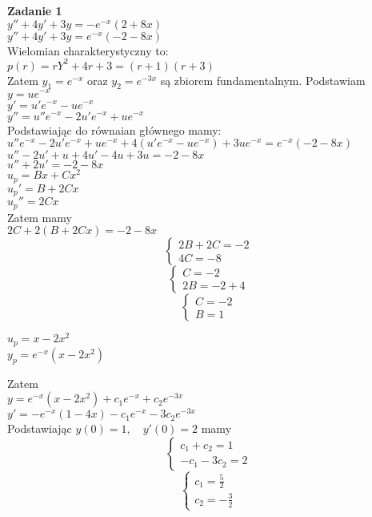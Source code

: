 \documentclass[10pt,a4paper]{article}
\author{ola}
\begin{document}
	\textbf{Zadanie 1} \\
	$y'' + 4y' +3y = -e^{-x}(2+8x) $ \\
	$y'' + 4y' +3y = e^{-x}(-2-8x) $ \\
	Wielomian charakterystyczny to: \\
	$p(r) = rY^2 + 4r + 3 = (r+1)(r+3)$ \\
	Zatem $y_{1}= e^{-x}$ oraz $ y_{2} = e^{-3x}$ są zbiorem fundamentalnym.
	Podstawiam $y = ue^{-x} $  \\
	$y'=u'e^{-x} - ue^{-x} $ \\
	$y''=u''e^{-x} -2u'e^{-x} + ue^{-x} $	  \\
	Podstawiając do równaian głównego mamy: \\
	$u''e^{-x} -2u'e^{-x} + ue^{-x} + 4(u'e^{-x} - ue^{-x}) + 3ue^{-x} = e^{-x}(-2-8x) $ \\
	$u'' -2u' + u + 4u'-4u + 3u = -2-8x $ \\
	$u'' + 2u' = -2 -8x $ \\
	$u_{p} = Bx + Cx^2$ \\
	$u_{p}' = B + 2Cx$ \\
	$u_{p}'' =  2Cx$ \\
	
	Zatem mamy\\
	$2C + 2(B+ 2Cx) = -2 -8x $\\
	$$ 
	\left\{ \begin{array}{l}
	2B + 2C = -2 \\
	4C = -8
	\end{array}\right. 
	$$
	$$ 
	\left\{ \begin{array}{l}
	C = -2 \\
	2B = -2 +4 
	\end{array}\right. 
	$$
	$$ 
	\left\{ \begin{array}{l}
	C = -2 \\
    B = 1 
	\end{array}\right. 
	$$
	
	$u_{p} = x - 2x^2 $ \\
	$y_{p} = e^{-x}(x - 2x^2)$
	
	Zatem \\
	$y = e^{-x}(x - 2x^2) + c_{1}e^{-x} + c_{2}e^{-3x} $ \\
	$y' = -e^{-x}(1 - 4x) - c_{1}e^{-x} -3c_{2}e^{-3x} $ \\
	Podstawiając $y(0) = 1, \quad y'(0) = 2 $ mamy \\
	$$ 
	\left\{ \begin{array}{l}
	c_{1} + c_{2} = 1\\
	 - c_{1} -3c_{2} = 2
	\end{array}\right. 
	$$
		$$ 
	\left\{ \begin{array}{l}
	c_{1}  = \frac{5}{2}\\
	c_{2} = -\frac{3}{2}
	\end{array}\right. 
	$$
	
\end{document}
